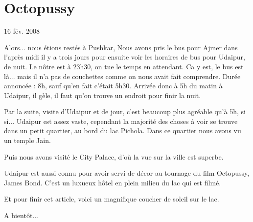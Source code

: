 \section{Octopussy}

16 fév. 2008

\begin{multicols}{2}

Alors... nous étions restés à Pushkar, Nous avons pris le bus pour Ajmer dans l'après midi il y a trois jours pour ensuite voir les horaires de bus pour Udaipur, de nuit. Le nôtre est à 23h30, on tue le temps en attendant. Ca y est, le bus est là... mais il n'a pas de couchettes comme on nous avait fait comprendre. Durée annoncée : 8h, sauf qu'en fait c'était 5h30. Arrivée donc à 5h du matin à Udaipur, il gèle, il faut qu'on trouve un endroit pour finir la nuit.

Par la suite, visite d'Udaipur et de jour, c'est beaucoup plus agréable qu'à 5h, si si... Udaipur est assez vaste, cependant la majorité des choses à voir se trouve dans un petit quartier, au bord du lac Pichola. Dans ce quartier nous avons vu un temple Jain.


Puis nous avons visité le City Palace, d'où la vue sur la ville est superbe.


Udaipur est aussi connu pour avoir servi de décor au tournage du film Octopussy, James Bond. C'est un luxueux hôtel en plein milieu du lac qui est filmé.


Et pour finir cet article, voici un magnifique coucher de soleil sur le lac.


A bientôt...

\end{multicols}


